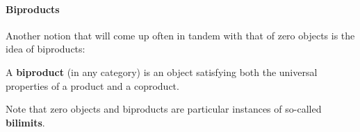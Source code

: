                 \paragraph{Biproducts}
                    Another notion that will come up often in tandem with that of zero objects is the idea of biproducts:
                    \begin{definition}[Biproducts] \label{def: biproducts} 
                        A \textbf{biproduct} (in any category) is an object satisfying both the universal properties of a product and a coproduct.
                    \end{definition}
                    \begin{remark}
                        Note that zero objects and biproducts are particular instances of so-called \textbf{bilimits}. 
                    \end{remark}
                    
